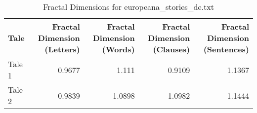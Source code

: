 \begin{table}[h]
\centering
\caption{Fractal Dimensions for europeana_stories_de.txt}
\label{tab:fractal-dimensions-europeana_stories_de.txt}
\begin{tabular}{lrrrr}
\toprule
 Tale   &   Fractal Dimension (Letters) &   Fractal Dimension (Words) &   Fractal Dimension (Clauses) &   Fractal Dimension (Sentences) \\
\midrule
 Tale 1 &                        0.9677 &                      1.111  &                        0.9109 &                          1.1367 \\
 Tale 2 &                        0.9839 &                      1.0898 &                        1.0982 &                          1.1444 \\
\bottomrule
\end{tabular}
\end{table}